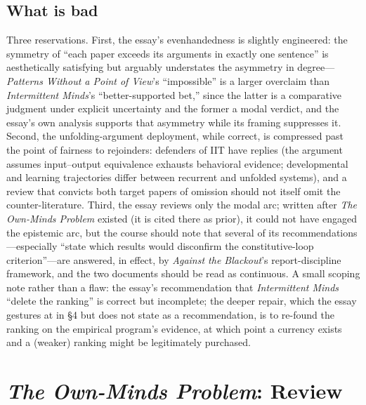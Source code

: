 \documentclass[11pt]{article}
\newcommand{\IM}{\emph{Intermittent Minds}}
\newcommand{\PP}{\emph{Patterns Without a Point of View}}
\newcommand{\OM}{\emph{The Own-Minds Problem}}
\newcommand{\AB}{\emph{Against the Blackout}}
\begin{document}
\subsection{What is bad}
Three reservations. First, the essay's evenhandedness is slightly engineered: the symmetry of ``each paper exceeds its arguments in exactly one sentence'' is aesthetically satisfying but arguably understates the asymmetry in degree---\PP{}'s ``impossible'' is a larger overclaim than \IM{}'s ``better-supported bet,'' since the latter is a comparative judgment under explicit uncertainty and the former a modal verdict, and the essay's own analysis supports that asymmetry while its framing suppresses it. Second, the unfolding-argument deployment, while correct, is compressed past the point of fairness to rejoinders: defenders of IIT have replies (the argument assumes input--output equivalence exhausts behavioral evidence; developmental and learning trajectories differ between recurrent and unfolded systems), and a review that convicts both target papers of omission should not itself omit the counter-literature. Third, the essay reviews only the modal arc; written after \OM{} existed (it is cited there as prior), it could not have engaged the epistemic arc, but the course should note that several of its recommendations---especially ``state which results would disconfirm the constitutive-loop criterion''---are answered, in effect, by \AB{}'s report-discipline framework, and the two documents should be read as continuous. A small scoping note rather than a flaw: the essay's recommendation that \IM{} ``delete the ranking'' is correct but incomplete; the deeper repair, which the essay gestures at in \S 4 but does not state as a recommendation, is to re-found the ranking on the empirical program's evidence, at which point a currency exists and a (weaker) ranking might be legitimately purchased.

\section{\OM{}: Review}
\end{document}
